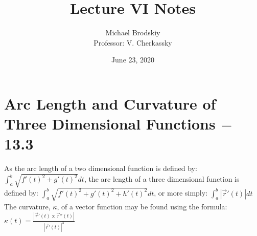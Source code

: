 \documentclass[12pt]{article}
\title{Lecture VI Notes}
\date{June 23, 2020}
\author{Michael Brodskiy\\ \small Professor: V. Cherkassky}
\begin{document}
\maketitle

\section{Arc Length and Curvature of Three Dimensional Functions $-$ 13.3}

As the arc length of a two dimensional function is defined by: $\int_{a}^{b} \sqrt{f'(t)^2 + g'(t)^2} dt$, the arc length of a three dimensional function is defined by: $\int_{a}^{b} \sqrt{f'(t)^2 + g'(t)^2 + h'(t)^2} dt$, or more simply: $\int_{a}^{b} |\overrightarrow{r}'(t)|dt$\\

The curvature, $\kappa$, of a vector function may be found using the formula: $\kappa(t)=\frac{|\overrightarrow{r}'(t)\text{ x } \overrightarrow{r}''(t)|}{|\overrightarrow{r}'(t)|^3}$
\end{document}
